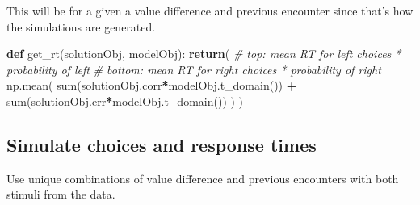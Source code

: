 \documentclass[
]{book}
\newenvironment{Shaded}{\begin{snugshade}}{\end{snugshade}}
\newcommand{\BuiltInTok}[1]{#1}
\newcommand{\CommentTok}[1]{\textcolor[rgb]{0.56,0.35,0.01}{\textit{#1}}}
\newcommand{\ControlFlowTok}[1]{\textcolor[rgb]{0.13,0.29,0.53}{\textbf{#1}}}
\newcommand{\KeywordTok}[1]{\textcolor[rgb]{0.13,0.29,0.53}{\textbf{#1}}}
\newcommand{\NormalTok}[1]{#1}
\newcommand{\OperatorTok}[1]{\textcolor[rgb]{0.81,0.36,0.00}{\textbf{#1}}}
\begin{document}
This will be for a given a value difference and previous encounter since that's how the simulations are generated.

\begin{Shaded}
\begin{Highlighting}[]
\KeywordTok{def}\NormalTok{ get\_rt(solutionObj, modelObj):}
  \ControlFlowTok{return}\NormalTok{(}
    \CommentTok{\# top: mean RT for left choices * probability of left}
    \CommentTok{\# bottom: mean RT for right choices * probability of right}
\NormalTok{    np.mean(}
      \BuiltInTok{sum}\NormalTok{(solutionObj.corr}\OperatorTok{*}\NormalTok{modelObj.t\_domain()) }\OperatorTok{+}
      \BuiltInTok{sum}\NormalTok{(solutionObj.err}\OperatorTok{*}\NormalTok{modelObj.t\_domain())}
\NormalTok{    )}
\NormalTok{  )}
\end{Highlighting}
\end{Shaded}

\hypertarget{simulate-choices-and-response-times}{%
\subsection{Simulate choices and response times}\label{simulate-choices-and-response-times}}

Use unique combinations of value difference and previous encounters with both stimuli from the data.
\end{document}
